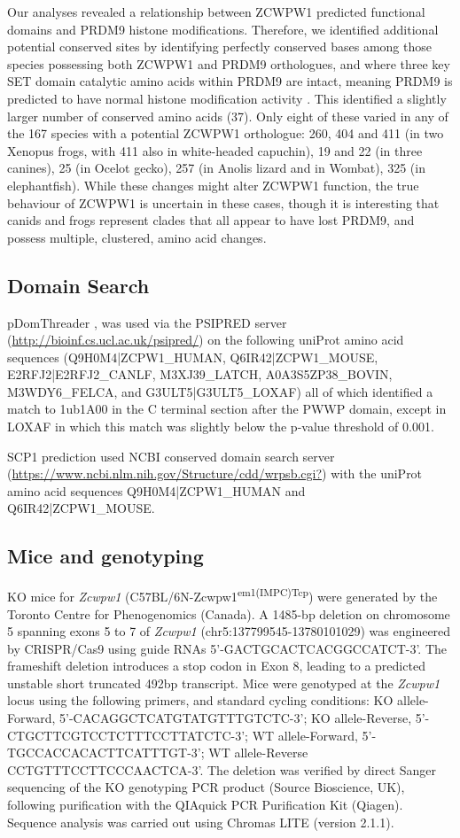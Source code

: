 Our analyses revealed a relationship between ZCWPW1 predicted functional domains and PRDM9 histone modifications. Therefore, we identified additional potential conserved sites by identifying perfectly conserved bases among those species possessing both ZCWPW1 and PRDM9 orthologues, and where three key SET domain catalytic amino acids within PRDM9 are intact, meaning PRDM9 is predicted to have normal histone modification activity \parencite{Baker2017Repeated}. This identified a slightly larger number of conserved amino acids (37). Only eight of these varied in any of the 167 species with a potential ZCWPW1 orthologue: 260, 404 and 411 (in two Xenopus frogs, with 411 also in white-headed capuchin), 19 and 22 (in three canines), 25 (in Ocelot gecko), 257 (in Anolis lizard and in Wombat), 325 (in elephantfish). While these changes might alter ZCWPW1 function, the true behaviour of ZCWPW1 is uncertain in these cases, though it is interesting that canids and frogs represent clades that all appear to have lost PRDM9, and possess multiple, clustered, amino acid changes. 

\subsection{Domain Search}
\label{sec:threading}
pDomThreader \parencite{Lobley2009pGenTHREADER}, was used via the PSIPRED server (\url{http://bioinf.cs.ucl.ac.uk/psipred/}) on the following uniProt amino acid sequences (Q9H0M4|ZCPW1\_HUMAN, Q6IR42|ZCPW1\_MOUSE, E2RFJ2|E2RFJ2\_CANLF, M3XJ39\_LATCH, A0A3S5ZP38\_BOVIN, M3WDY6\_FELCA, and G3ULT5|G3ULT5\_LOXAF) all of which identified a match to 1ub1A00 in the C terminal section after the PWWP domain, except in LOXAF in which this match was slightly below the p-value threshold of 0.001.

SCP1 prediction used NCBI conserved domain search server (\url{https://www.ncbi.nlm.nih.gov/Structure/cdd/wrpsb.cgi?}) with the uniProt amino acid sequences Q9H0M4|ZCPW1\_HUMAN and Q6IR42|ZCPW1\_MOUSE.

\subsection{Mice and genotyping}
\label{sec:komice}
KO mice for \textit{Zcwpw1} (C57BL/6N-Zcwpw1\textsuperscript{em1(IMPC)Tcp}) were generated by the Toronto Centre for Phenogenomics (Canada). A 1485-bp deletion on chromosome 5 spanning exons 5 to 7 of \textit{Zcwpw1} (chr5:137799545-13780101029) was engineered by CRISPR/Cas9 using guide RNAs 5’-GACTGCACTCACGGCCATCT-3’. The frameshift deletion introduces a stop codon in Exon 8, leading to a predicted unstable short truncated 492bp transcript. Mice were genotyped at the \textit{Zcwpw1} locus using the following primers, and standard cycling conditions: KO allele-Forward, 5’-CACAGGCTCATGTATGTTTGTCTC-3’; KO allele-Reverse, 5’-CTGCTTCGTCCTCTTTCCTTATCTC-3’; WT allele-Forward, 5’-TGCCACCACACTTCATTTGT-3’; WT allele-Reverse CCTGTTTCCTTCCCAACTCA-3’. The deletion was verified by direct Sanger sequencing of the KO genotyping PCR product (Source Bioscience, UK), following purification with the QIAquick PCR Purification Kit (Qiagen). Sequence analysis was carried out using Chromas LITE (version 2.1.1). 

